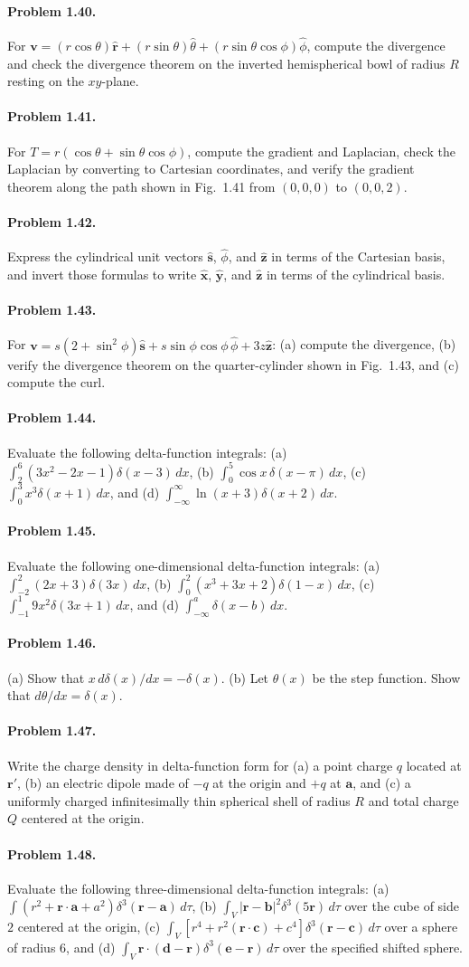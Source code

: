 \documentclass{aa}
\newcommand{\problemstatement}[2]{%
\paragraph{Problem #1.}#2\par\medskip
}
\begin{document}
\problemstatement{1.40}{For \(\mathbf v=(r\cos\theta)\hat{\mathbf r}+(r\sin\theta)\hat{\theta}+(r\sin\theta\cos\phi)\hat{\phi}\), compute the divergence and check the divergence theorem on the inverted hemispherical bowl of radius \(R\) resting on the \(xy\)-plane.}
\problemstatement{1.41}{For \(T=r(\cos\theta+\sin\theta\cos\phi)\), compute the gradient and Laplacian, check the Laplacian by converting to Cartesian coordinates, and verify the gradient theorem along the path shown in Fig.~1.41 from \((0,0,0)\) to \((0,0,2)\).}
\problemstatement{1.42}{Express the cylindrical unit vectors \(\hat{\mathbf s}\), \(\hat{\phi}\), and \(\hat{\mathbf z}\) in terms of the Cartesian basis, and invert those formulas to write \(\hat{\mathbf x}\), \(\hat{\mathbf y}\), and \(\hat{\mathbf z}\) in terms of the cylindrical basis.}
\problemstatement{1.43}{For \(\mathbf v=s(2+\sin^2\phi)\hat{\mathbf s}+s\sin\phi\cos\phi\,\hat{\phi}+3z\hat{\mathbf z}\): (a) compute the divergence, (b) verify the divergence theorem on the quarter-cylinder shown in Fig.~1.43, and (c) compute the curl.}
\problemstatement{1.44}{Evaluate the following delta-function integrals: (a) \(\int_2^6 (3x^2-2x-1)\delta(x-3)\,dx\), (b) \(\int_0^5 \cos x\,\delta(x-\pi)\,dx\), (c) \(\int_0^3 x^3\delta(x+1)\,dx\), and (d) \(\int_{-\infty}^{\infty}\ln(x+3)\delta(x+2)\,dx\).}
\problemstatement{1.45}{Evaluate the following one-dimensional delta-function integrals: (a) \(\int_{-2}^{2}(2x+3)\delta(3x)\,dx\), (b) \(\int_{0}^{2}(x^3+3x+2)\delta(1-x)\,dx\), (c) \(\int_{-1}^{1}9x^2\delta(3x+1)\,dx\), and (d) \(\int_{-\infty}^{a}\delta(x-b)\,dx\).}
\problemstatement{1.46}{(a) Show that \(x\,d\delta(x)/dx=-\delta(x)\). (b) Let \(\theta(x)\) be the step function. Show that \(d\theta/dx=\delta(x)\).}
\problemstatement{1.47}{Write the charge density in delta-function form for (a) a point charge \(q\) located at \(\mathbf r'\), (b) an electric dipole made of \(-q\) at the origin and \(+q\) at \(\mathbf a\), and (c) a uniformly charged infinitesimally thin spherical shell of radius \(R\) and total charge \(Q\) centered at the origin.}
\problemstatement{1.48}{Evaluate the following three-dimensional delta-function integrals: (a) \(\int (r^2+\mathbf r\cdot\mathbf a+a^2)\delta^3(\mathbf r-\mathbf a)\,d\tau\), (b) \(\int_V |\mathbf r-\mathbf b|^2\delta^3(5\mathbf r)\,d\tau\) over the cube of side \(2\) centered at the origin, (c) \(\int_V [r^4+r^2(\mathbf r\cdot\mathbf c)+c^4]\delta^3(\mathbf r-\mathbf c)\,d\tau\) over a sphere of radius \(6\), and (d) \(\int_V \mathbf r\cdot(\mathbf d-\mathbf r)\delta^3(\mathbf e-\mathbf r)\,d\tau\) over the specified shifted sphere.}
\end{document}
